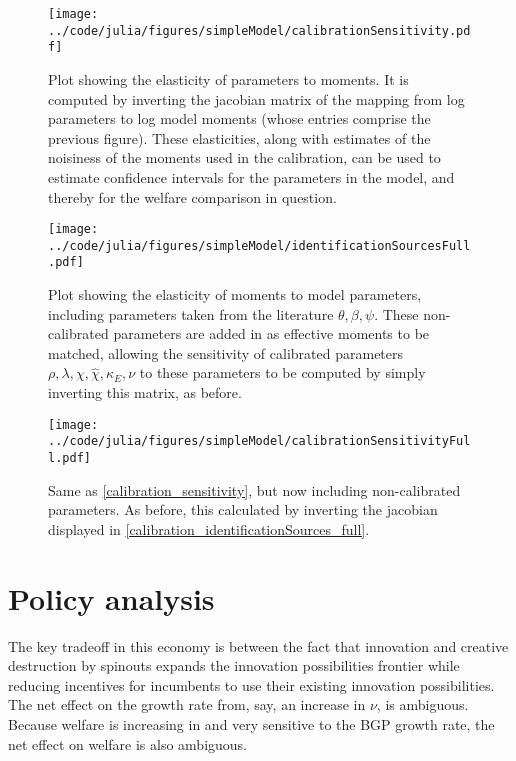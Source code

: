 \documentclass[11pt,english]{article}
\theoremstyle{remark}
\begin{document}
\begin{figure}[]
	\texttt{[image: ../code/julia/figures/simpleModel/calibrationSensitivity.pdf]}
	\caption{Plot showing the elasticity of parameters to moments. It is computed by inverting the jacobian matrix of the mapping from log parameters to log model moments (whose entries comprise the previous figure). These elasticities, along with estimates of the noisiness of the moments used in the calibration, can be used to estimate confidence intervals for the parameters in the model, and thereby for the welfare comparison in question.}
	\label{calibration_sensitivity}
\end{figure}

\begin{figure}[]
	\texttt{[image: ../code/julia/figures/simpleModel/identificationSourcesFull.pdf]}
	\caption{Plot showing the elasticity of moments to model parameters, including parameters taken from the literature $\theta , \beta, \psi$. These non-calibrated parameters are added in as effective moments to be matched, allowing the sensitivity of calibrated parameters $\rho, \lambda, \chi, \hat{\chi}, \kappa_E, \nu$ to these parameters to be computed by simply inverting this matrix, as before.}
	\label{calibration_identificationSources_full}
\end{figure}

\begin{figure}[]
	\texttt{[image: ../code/julia/figures/simpleModel/calibrationSensitivityFull.pdf]}
	\caption{Same as \autoref{calibration_sensitivity}, but now including non-calibrated parameters. As before, this calculated by inverting the jacobian displayed in \autoref{calibration_identificationSources_full}.}
	\label{calibration_sensitivity_full}
\end{figure}

\section{Policy analysis}

The key tradeoff in this economy is between the fact that innovation and creative destruction by spinouts expands the innovation possibilities frontier while reducing incentives for incumbents to use their existing innovation possibilities. The net effect on the growth rate from, say, an increase in $\nu$, is ambiguous. Because welfare is increasing in and very sensitive to the BGP growth rate, the net effect on welfare is also ambiguous.
\end{document}
